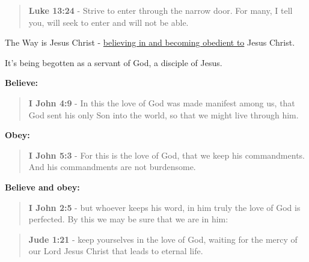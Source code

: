 \documentclass[11pt]{article}
\begin{document}
\begin{quote}
\textbf{Luke 13:24} - Strive to enter through the narrow door. For many, I tell you, will seek to enter and will not be able.
\end{quote}

The Way is Jesus Christ - \uline{believing in and becoming obedient to} Jesus Christ.

It's being begotten as a servant of God, a disciple of Jesus.

\textbf{Believe:}

\begin{quote}
\textbf{I John 4:9} - In this the love of God was made manifest among us, that God sent his only Son into the world, so that we might live through him.
\end{quote}

\textbf{Obey:}

\begin{quote}
\textbf{I John 5:3} - For this is the love of God, that we keep his commandments. And his commandments are not burdensome.
\end{quote}

\textbf{Believe and obey:}

\begin{quote}
\textbf{I John 2:5} - but whoever keeps his word, in him truly the love of God is perfected. By this we may be sure that we are in him:
\end{quote}

\begin{quote}
\textbf{Jude 1:21} - keep yourselves in the love of God, waiting for the mercy of our Lord Jesus Christ that leads to eternal life.
\end{quote}
\end{document}
